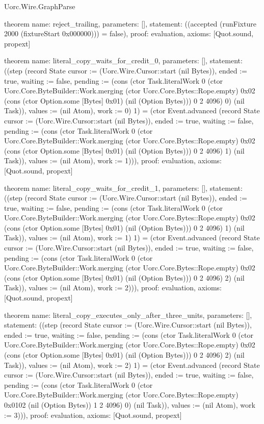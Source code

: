 \begin{lexlean}{Uorc.Wire.GraphParse}
\begin{semanticmodule}
theorem{
  name: reject_trailing,
  parameters: [],
  statement: ((accepted (runFixture 2000 (fixtureStart 0x000000))) = false),
  proof: evaluation{},
  axioms: [Quot.sound, propext]
}

theorem{
  name: literal_copy_waits_for_credit_0,
  parameters: [],
  statement: ((step (record State {cursor := (Uorc.Wire.Cursor::start (nil Bytes)), ended := true, waiting := false, pending := (cons (ctor Task.literalWork 0 (ctor Uorc.Core.ByteBuilder::Work.merging (ctor Uorc.Core.Bytes::Rope.empty) 0x02 (cons (ctor Option.some [Bytes] 0x01) (nil (Option Bytes))) 0 2 4096) 0) (nil Task)), values := (nil Atom), work := 0}) 1) = (ctor Event.advanced (record State {cursor := (Uorc.Wire.Cursor::start (nil Bytes)), ended := true, waiting := false, pending := (cons (ctor Task.literalWork 0 (ctor Uorc.Core.ByteBuilder::Work.merging (ctor Uorc.Core.Bytes::Rope.empty) 0x02 (cons (ctor Option.some [Bytes] 0x01) (nil (Option Bytes))) 0 2 4096) 1) (nil Task)), values := (nil Atom), work := 1}))),
  proof: evaluation{},
  axioms: [Quot.sound, propext]
}

theorem{
  name: literal_copy_waits_for_credit_1,
  parameters: [],
  statement: ((step (record State {cursor := (Uorc.Wire.Cursor::start (nil Bytes)), ended := true, waiting := false, pending := (cons (ctor Task.literalWork 0 (ctor Uorc.Core.ByteBuilder::Work.merging (ctor Uorc.Core.Bytes::Rope.empty) 0x02 (cons (ctor Option.some [Bytes] 0x01) (nil (Option Bytes))) 0 2 4096) 1) (nil Task)), values := (nil Atom), work := 1}) 1) = (ctor Event.advanced (record State {cursor := (Uorc.Wire.Cursor::start (nil Bytes)), ended := true, waiting := false, pending := (cons (ctor Task.literalWork 0 (ctor Uorc.Core.ByteBuilder::Work.merging (ctor Uorc.Core.Bytes::Rope.empty) 0x02 (cons (ctor Option.some [Bytes] 0x01) (nil (Option Bytes))) 0 2 4096) 2) (nil Task)), values := (nil Atom), work := 2}))),
  proof: evaluation{},
  axioms: [Quot.sound, propext]
}

theorem{
  name: literal_copy_executes_only_after_three_units,
  parameters: [],
  statement: ((step (record State {cursor := (Uorc.Wire.Cursor::start (nil Bytes)), ended := true, waiting := false, pending := (cons (ctor Task.literalWork 0 (ctor Uorc.Core.ByteBuilder::Work.merging (ctor Uorc.Core.Bytes::Rope.empty) 0x02 (cons (ctor Option.some [Bytes] 0x01) (nil (Option Bytes))) 0 2 4096) 2) (nil Task)), values := (nil Atom), work := 2}) 1) = (ctor Event.advanced (record State {cursor := (Uorc.Wire.Cursor::start (nil Bytes)), ended := true, waiting := false, pending := (cons (ctor Task.literalWork 0 (ctor Uorc.Core.ByteBuilder::Work.merging (ctor Uorc.Core.Bytes::Rope.empty) 0x0102 (nil (Option Bytes)) 1 2 4096) 0) (nil Task)), values := (nil Atom), work := 3}))),
  proof: evaluation{},
  axioms: [Quot.sound, propext]
}


\end{semanticmodule}
\end{lexlean}
